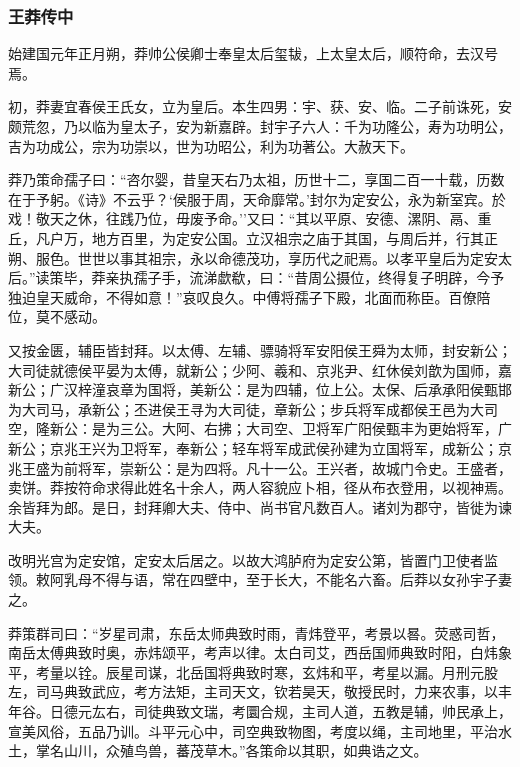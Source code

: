 \documentclass[]{article}
\begin{document}
\hypertarget{header-n6816}{%
\subsubsection{王莽传中}\label{header-n6816}}

始建国元年正月朔，莽帅公侯卿士奉皇太后玺韨，上太皇太后，顺符命，去汉号焉。

初，莽妻宜春侯王氏女，立为皇后。本生四男：宇、获、安、临。二子前诛死，安颇荒忽，乃以临为皇太子，安为新嘉辟。封宇子六人：千为功隆公，寿为功明公，吉为功成公，宗为功崇以，世为功昭公，利为功著公。大赦天下。

莽乃策命孺子曰：``咨尔婴，昔皇天右乃太祖，历世十二，享国二百一十载，历数在于予躬。《诗》不云乎？`侯服于周，天命靡常。'封尔为定安公，永为新室宾。於戏！敬天之休，往践乃位，毋废予命。''又曰：``其以平原、安德、漯阴、鬲、重丘，凡户万，地方百里，为定安公国。立汉祖宗之庙于其国，与周后并，行其正朔、服色。世世以事其祖宗，永以命德茂功，享历代之祀焉。以孝平皇后为定安太后。''读策毕，莽亲执孺子手，流涕歔欷，曰：``昔周公摄位，终得复子明辟，今予独迫皇天威命，不得如意！''哀叹良久。中傅将孺子下殿，北面而称臣。百僚陪位，莫不感动。

又按金匮，辅臣皆封拜。以太傅、左辅、骠骑将军安阳侯王舜为太师，封安新公；大司徒就德侯平晏为太傅，就新公；少阿、羲和、京兆尹、红休侯刘歆为国师，嘉新公；广汉梓潼哀章为国将，美新公：是为四辅，位上公。太保、后承承阳侯甄邯为大司马，承新公；丕进侯王寻为大司徒，章新公；步兵将军成都侯王邑为大司空，隆新公：是为三公。大阿、右拂；大司空、卫将军广阳侯甄丰为更始将军，广新公；京兆王兴为卫将军，奉新公；轻车将军成武侯孙建为立国将军，成新公；京兆王盛为前将军，崇新公：是为四将。凡十一公。王兴者，故城门令史。王盛者，卖饼。莽按符命求得此姓名十余人，两人容貌应卜相，径从布衣登用，以视神焉。余皆拜为郎。是日，封拜卿大夫、侍中、尚书官凡数百人。诸刘为郡守，皆徙为谏大夫。

改明光宫为定安馆，定安太后居之。以故大鸿胪府为定安公第，皆置门卫使者监领。敕阿乳母不得与语，常在四壁中，至于长大，不能名六畜。后莽以女孙宇子妻之。

莽策群司曰：``岁星司肃，东岳太师典致时雨，青炜登平，考景以晷。荧惑司哲，南岳太傅典致时奥，赤炜颂平，考声以律。太白司艾，西岳国师典致时阳，白炜象平，考量以铨。辰星司谋，北岳国将典致时寒，玄炜和平，考星以漏。月刑元股左，司马典致武应，考方法矩，主司天文，钦若昊天，敬授民时，力来农事，以丰年谷。日德元厷右，司徒典致文瑞，考圜合规，主司人道，五教是辅，帅民承上，宣美风俗，五品乃训。斗平元心中，司空典致物图，考度以绳，主司地里，平治水土，掌名山川，众殖鸟兽，蕃茂草木。''各策命以其职，如典诰之文。
\end{document}
